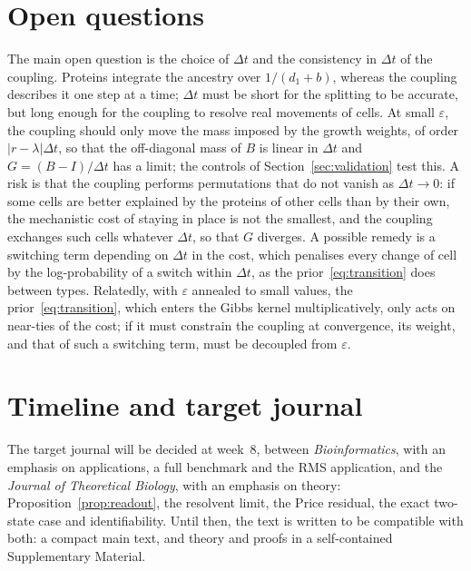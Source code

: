 \documentclass[a4paper, 11pt]{article}
\theoremstyle{plain}
\theoremstyle{remark}
\begin{document}
\section{Open questions}\label{sec:open}

The main open question is the choice of $\Delta t$ and the consistency in $\Delta t$ of the coupling. Proteins integrate the ancestry over $1/(d_1 + b)$, whereas the coupling describes it one step at a time; $\Delta t$ must be short for the splitting to be accurate, but long enough for the coupling to resolve real movements of cells. At small $\varepsilon$, the coupling should only move the mass imposed by the growth weights, of order $|r - \lambda|\Delta t$, so that the off-diagonal mass of $B$ is linear in $\Delta t$ and $G = (B - I)/\Delta t$ has a limit; the controls of Section~\ref{sec:validation} test this. A risk is that the coupling performs permutations that do not vanish as $\Delta t \to 0$: if some cells are better explained by the proteins of other cells than by their own, the mechanistic cost of staying in place is not the smallest, and the coupling exchanges such cells whatever $\Delta t$, so that $G$ diverges. A possible remedy is a switching term depending on $\Delta t$ in the cost, which penalises every change of cell by the log-probability of a switch within $\Delta t$, as the prior~\eqref{eq:transition} does between types. Relatedly, with $\varepsilon$ annealed to small values, the prior~\eqref{eq:transition}, which enters the Gibbs kernel multiplicatively, only acts on near-ties of the cost; if it must constrain the coupling at convergence, its weight, and that of such a switching term, must be decoupled from $\varepsilon$.

\section{Timeline and target journal}\label{sec:timeline}

The target journal will be decided at week~8, between \emph{Bioinformatics}, with an emphasis on applications, a full benchmark and the RMS application, and the \emph{Journal of Theoretical Biology}, with an emphasis on theory: Proposition~\ref{prop:readout}, the resolvent limit, the Price residual, the exact two-state case and identifiability. Until then, the text is written to be compatible with both: a compact main text, and theory and proofs in a self-contained Supplementary Material.
\end{document}
